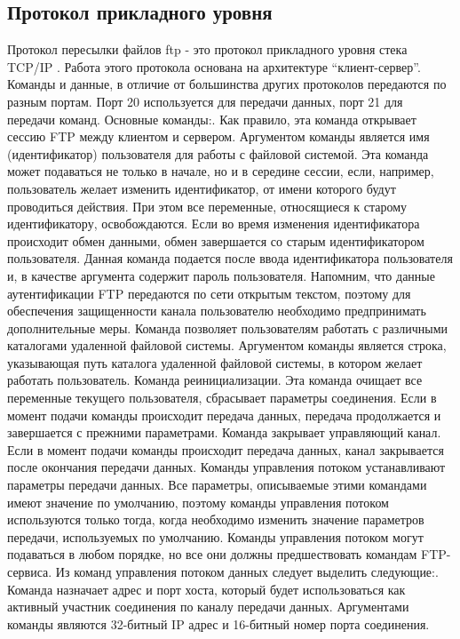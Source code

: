\subsection{Протокол прикладного уровня}
Протокол пересылки файлов ftp - это протокол прикладного уровня стека TCP/IP . 
Работа этого протокола основана на архитектуре “клиент-сервер”. 
Команды и данные, в отличие от большинства других протоколов передаются по разным портам. 
Порт 20 используется для передачи данных, порт 21 для передачи команд. Основные команды:. 
Как правило, эта команда открывает сессию FTP между клиентом и сервером. 
Аргументом команды является имя (идентификатор) пользователя для работы с файловой системой. 
Эта команда может подаваться не только в начале, но и в середине сессии, если, например, пользователь желает изменить идентификатор, от имени которого будут проводиться действия. 
При этом все переменные, относящиеся к старому идентификатору, освобождаются. 
Если во время изменения идентификатора происходит обмен данными, обмен завершается со старым идентификатором пользователя. 
Данная команда подается после ввода идентификатора пользователя и, в качестве аргумента содержит пароль пользователя. 
Напомним, что данные аутентификации FTP передаются по сети открытым текстом, поэтому для обеспечения защищенности канала пользователю необходимо предпринимать дополнительные меры. 
Команда позволяет пользователям работать с различными каталогами удаленной файловой системы. 
Аргументом команды является строка, указывающая путь каталога удаленной файловой системы, в котором желает работать пользователь. 
Команда реинициализации. Эта команда очищает все переменные текущего пользователя, сбрасывает параметры соединения. 
Если в момент подачи команды происходит передача данных, передача продолжается и завершается с прежними параметрами. 
Команда закрывает управляющий канал. 
Если в момент подачи команды происходит передача данных, канал закрывается после окончания передачи данных. 
Команды управления потоком устанавливают параметры передачи данных. 
Все параметры, описываемые этими командами имеют значение по умолчанию, поэтому команды управления потоком используются только тогда, когда необходимо изменить значение параметров передачи, используемых по умолчанию. 
Команды управления потоком могут подаваться в любом порядке, но все они должны предшествовать командам FTP-сервиса. 
Из команд управления потоком данных следует выделить следующие:. Команда назначает адрес и порт хоста, который будет использоваться как активный участник соединения по каналу передачи данных. Аргументами команды являются 32-битный IP адрес и 16-битный номер порта соединения. 
